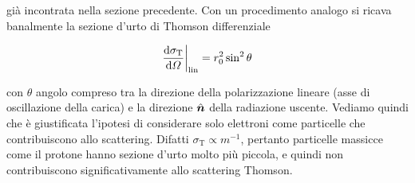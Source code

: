 già incontrata nella sezione precedente. Con un procedimento analogo si ricava banalmente la sezione d'urto di Thomson differenziale
\begin{EQ}
\begin{equation}
\dfrac{\mathrm{d} {\sigma_\mathrm{T}}}{\mathrm{d} {\Omega}} \bigg|_\mathrm{lin} = r_0^2 \sin^2\theta
\end{equation}
\end{EQ}
con $\theta$ angolo compreso tra la direzione della polarizzazione lineare (asse di oscillazione della carica) e la direzione $\vers{n}$ della radiazione uscente.
Vediamo quindi che è giustificata l'ipotesi di considerare solo elettroni come particelle che contribuiscono allo scattering. Difatti $\sigma_\mathrm{T} \propto m^{-1}$, pertanto particelle massicce come il protone hanno sezione d'urto molto più piccola, e quindi non contribuiscono significativamente allo scattering Thomson.

